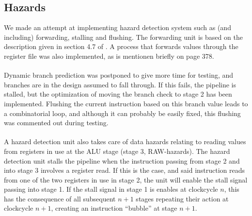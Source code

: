\subsection{Hazards}
We made an attempt at implementing hazard detection system such as (and
including) forwarding, stalling and flushing. The forwarding unit is based on
the description given in section 4.7 of \cite{patterson12}. A process that
forwards values through the register file was also implemented, as is mentionen
briefly on page  378.
\paragraph*{}
Dynamic branch prediction was postponed to give more time for testing, and
branches are in the design assumed to fall through. If this fails, the pipeline
is stalled, but the optimization of moving the branch check to stage 2 has been
implemented. Flushing the current instruction based on this branch value leads
to a combinatorial loop, and although it can probably be easily fixed, this
flushing was commented out during testing.
\paragraph*{}
A hazard detection unit also takes care of data hazards relating to reading
values from registers in use at the ALU stage (stage 3, RAW-hazards). The
hazard detection unit stalls the pipeline when the instruction passing from
stage 2 and into stage 3 involves a register read. If this is the case, and said
instruction reads from one of the two registers in use in stage 2, the unit will
enable the stall signal passing into stage 1. If the stall signal in stage 1 is
enables at clockcycle $n$, this has the consequence of all subsequent $n+1$
stages repeating their action at clockcycle $n+1$, creating an instruction
``bubble'' at stage $n+1$.
